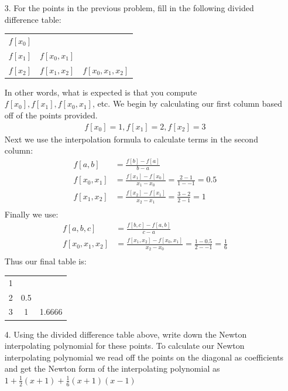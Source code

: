 \documentclass{article}
\begin{document}
\begin{itemize}
    \newpage
    \item[3.] For the points in the previous problem, fill in the following divided difference table:
    \begin{center}
        \begin{tabular}{ |c|c|c| } 
         \hline
         $f[x_0]$ &  &  \\ 
         $f[x_1]$ & $f[x_0, x_1]$ &  \\ 
         $f[x_2]$ & $f[x_1, x_2]$ & $f[x_0, x_1, x_2]$ \\ 
         \hline
        \end{tabular}
    \end{center}
    In other words, what is expected is that you compute $f[x_0], f[x_1], f[x_0, x_1]$, etc.
    We begin by calculating our first column based off of the points provided.
    \begin{align*}
        f[x_0] = 1,  f[x_1] = 2, f[x_2] = 3
    \end{align*}
    Next we use the interpolation formula to calculate terms in the second column:
    \begin{align*}
        f[a, b] &= \frac{f[b]-f[a]}{b-a}\\
        f[x_0, x_1] &= \frac{f[x_1]-f[x_0]}{x_1 - x_0} = \frac{2-1}{1--1} = 0.5\\
        f[x_1, x_2] &= \frac{f[x_2]-f[x_1]}{x_2 - x_1} = \frac{3-2}{2-1} = 1\\
    \end{align*}
    Finally we use:
    \begin{align*}
        f[a, b, c] &= \frac{f[b, c]-f[a, b]}{c-a}\\
        f[x_0, x_1, x_2] &= \frac{f[x_1, x_2]-f[x_0, x_1]}{x_2-x_0} = \frac{1-0.5}{2--1} = \frac{1}{6}\\
    \end{align*}
    Thus our final table is:
      \begin{center}
        \begin{tabular}{ |c|c|c| } 
         \hline
         1 &  &  \\ 
         2 & 0.5 &  \\ 
         3 & 1 & 1.6666\\ 
         \hline
        \end{tabular}
    \end{center}
    \item[4.] Using the divided difference table above, write down the Newton interpolating polynomial for these points.
    \newline\newline
    To calculate our Newton interpolating polynomial we read off the points on the diagonal as coefficients and get the Newton form of the interpolating polynomial as  $1 + \frac{1}{2}(x+1) + \frac{1}{6}(x+1)(x-1)$
\end{itemize}
\end{document}
